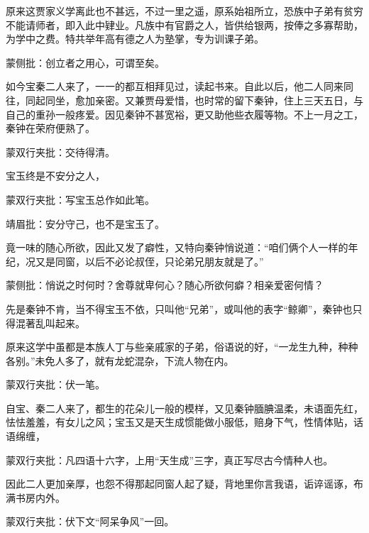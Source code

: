 \begin{parag}
    原来这贾家义学离此也不甚远，不过一里之遥，原系始祖所立，恐族中子弟有贫穷不能请师者，即入此中肄业。凡族中有官爵之人，皆供给银两，按俸之多寡帮助，为学中之费。特共举年高有德之人为塾掌，专为训课子弟。\begin{note}蒙侧批：创立者之用心，可谓至矣。\end{note}如今宝秦二人来了，一一的都互相拜见过，读起书来。自此以后，他二人同来同往，同起同坐，愈加亲密。又兼贾母爱惜，也时常的留下秦钟，住上三天五日，与自己的重孙一般疼爱。因见秦钟不甚宽裕，更又助他些衣履等物。不上一月之工，秦钟在荣府便熟了。\begin{note}蒙双行夹批：交待得清。\end{note}宝玉终是不安分之人，\begin{note}蒙双行夹批：写宝玉总作如此笔。\end{note}\begin{note}靖眉批：安分守己，也不是宝玉了。\end{note}竟一味的随心所欲，因此又发了癖性，又特向秦钟悄说道：“咱们俩个人一样的年纪，况又是同窗，以后不必论叔侄，只论弟兄朋友就是了。”\begin{note}蒙侧批：悄说之时何时？舍尊就卑何心？随心所欲何癖？相亲爱密何情？\end{note}先是秦钟不肯，当不得宝玉不依，只叫他“兄弟”，或叫他的表字“鲸卿”，秦钟也只得混著乱叫起来。
\end{parag}


\begin{parag}
    原来这学中虽都是本族人丁与些亲戚家的子弟，俗语说的好，“一龙生九种，种种各别。”未免人多了，就有龙蛇混杂，下流人物在内。\begin{note}蒙双行夹批：伏一笔。\end{note}自宝、秦二人来了，都生的花朵儿一般的模样，又见秦钟腼腆温柔，未语面先红，怯怯羞羞，有女儿之风；宝玉又是天生成惯能做小服低，赔身下气，性情体贴，话语绵缠，\begin{note}蒙双行夹批：凡四语十六字，上用“天生成”三字，真正写尽古今情种人也。\end{note}因此二人更加亲厚，也怨不得那起同窗人起了疑，背地里你言我语，诟谇谣诼，布满书房内外。\begin{note}蒙双行夹批：伏下文“阿呆争风”一回。\end{note}
\end{parag}


